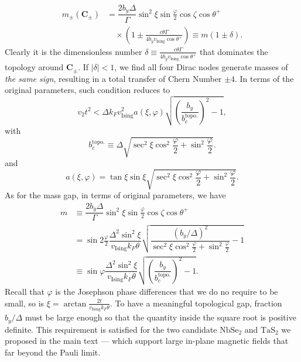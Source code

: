 \begin{subappendices}
			\begin{align}\label{topological mass gap}
				m_\pm(\bm{C}_\pm)&=\dfrac{2b_y\Delta}{\Gamma}\sin^2\xi\sin\frac{\varphi}{2}\cos\zeta\cos\theta^+\nonumber\\
				&\quad\times\left(1\pm\frac{c\theta\Gamma}{4b_yv_{\text{Ising}}\cos\theta^+}\right)\equiv m(1\pm\delta).
			\end{align}
			Clearly it is the dimensionless number $\delta\equiv\frac{c\theta\Gamma}{4b_yv_{\text{Ising}}\cos\theta^+}$ that dominates the topology around $\bm{C}_\pm$. If $|\delta|<1$, we find all four Dirac nodes generate masses of \emph{the same sign}, resulting in a total transfer of Chern Number $\pm4$. In terms of the original parameters, such condition reduces to
			\begin{equation}
				v_2t^2<\Delta k_Fv_{\text{Ising}}^2 a(\xi,\varphi)\sqrt{\left(\dfrac{b_y}{b_c^{\text{topo.}}}\right)^2-1},\label{eqn:v2_condition}
			\end{equation}
			with
			\begin{equation}\label{b_c topological}
				b_c^{\text{topo.}}\equiv\Delta\sqrt{\sec^2\xi\cos^2\frac{\varphi}{2}+\sin^2\frac{\varphi}{2}}.
			\end{equation}
			and
			\begin{equation*}
				a(\xi,\varphi)=\tan\xi\sin\xi\sqrt{\sec^2\xi\cos^2\frac{\varphi}{2}+\sin^2\frac{\varphi}{2}}.
			\end{equation*}
			As for the mass gap, in terms of original parameters, we have
			\begin{align}\label{topological mass gap (original paramter)}
				m&\equiv\dfrac{2b_y\Delta}{\Gamma}\sin^2\xi\sin\frac{\varphi}{2}\cos\zeta\cos\theta^+\nonumber\\
				&=\sin2\frac{\varphi}{2}\dfrac{\Delta^2\sin^2\xi}{v_{\text{Ising}} k_F\theta}\sqrt{\dfrac{(b_y/\Delta)^2}{\sec^2\xi\cos^2\frac{\varphi}{2}+\sin^2\frac{\varphi}{2}}-1}\nonumber\\
				&\equiv\sin\varphi\dfrac{\Delta^2\sin^2\xi}{v_{\text{Ising}} k_F\theta}\sqrt{\left(\dfrac{b_y}{b_c^{\text{topo.}}}\right)^2-1}.
			\end{align}
			Recall that $\varphi$ is the Josephson phase differences that we do no require to be small, so is $\xi=\arctan\frac{2t}{v_{\text{Ising}}k_F\theta}$. To have a meaningful topological gap, fraction $b_y/\Delta$ must be large enough so that the quantity inside the square root is positive definite. This requirement is satisfied for the two candidate $\mathrm{NbSe_2}$ and $\mathrm{TaS_2}$ we proposed in the main text --- which support large in-plane magnetic fields that far beyond the Pauli limit. 


\end{subappendices}
